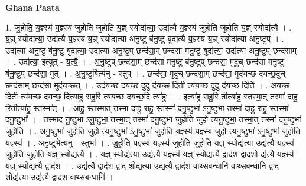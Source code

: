 \documentclass[17pt]{extarticle}
\begin{document}
\textbf{Ghana Paata } \newline

1. जु॒हो॒ति॒ य॒ज्ञ्स्य॑ य॒ज्ञ्स्य॑ जुहोति जुहोति य॒ज्ञ् स्योद्य॑त्या॒ उद्य॑त्यै य॒ज्ञ्स्य॑ जुहोति जुहोति य॒ज्ञ् स्योद्य॑त्यै । . य॒ज्ञ् स्योद्य॑त्या॒ उद्य॑त्यै य॒ज्ञ्स्य॑ य॒ज्ञ् स्योद्य॑त्या अनु॒ष्टु ब॑नु॒ष्टु बुद्य॑त्यै य॒ज्ञ्स्य॑ 
य॒ज्ञ् स्योद्य॑त्या अनु॒ष्टुप् । . उद्य॑त्या अनु॒ष्टु ब॑नु॒ष्टु बुद्य॑त्या॒ उद्य॑त्या अनु॒ष्टुप् छन्द॑सा॒म् छन्द॑सा मनु॒ष्टु बुद्य॑त्या॒ उद्य॑त्या अनु॒ष्टुप् छन्द॑साम् । . उद्य॑त्या॒ इत्युत् - य॒त्यै॒ । . अ॒नु॒ष्टुप् छन्द॑सा॒म् छन्द॑सा मनु॒ष्टु ब॑नु॒ष्टुप् छन्द॑सा॒ मुदुच् छन्द॑सा मनु॒ष्टु ब॑नु॒ष्टुप् छन्द॑सा॒ मुत् । . अ॒नु॒ष्टुबित्य॑नु - स्तुप् । . छन्द॑सा॒ मुदुच् छन्द॑सा॒म् छन्द॑सा॒ मुद॑यच्छ दयच्छ॒दुच् छन्द॑सा॒म् छन्द॑सा॒ मुद॑यच्छत् । . उद॑यच्छ दयच्छ॒ दुदु द॑यच्छ॒ दिती त्य॑यच्छ॒ दुदु द॑यच्छ॒ दिति॑ । . अ॒य॒च्छ॒ दिती त्य॑यच्छ दयच्छ॒ दित्या॑हु राहु॒रि त्य॑यच्छ दयच्छ॒दि त्या॑हुः । . इत्या॑हु राहु॒रि तीत्या॑हु॒ स्तस्मा॒त् तस्मा॑ दाहु॒ रितीत्या॑हु॒ स्तस्मा᳚त् । . आ॒हु॒ स्तस्मा॒त् तस्मा॑ दाहु राहु॒ स्तस्मा॑ दनु॒ष्टुभा॑ ऽनु॒ष्टुभा॒ तस्मा॑ दाहु राहु॒ स्तस्मा॑ दनु॒ष्टुभा᳚ । . तस्मा॑द नु॒ष्टुभा॑ ऽनु॒ष्टुभा॒ तस्मा॒त् तस्मा॑ दनु॒ष्टुभा॑ जुहोति जुहो त्यनु॒ष्टुभा॒ तस्मा॒त् तस्मा॑ दनु॒ष्टुभा॑ जुहोति । . अ॒नु॒ष्टुभा॑ जुहोति जुहो त्यनु॒ष्टुभा॑ ऽनु॒ष्टुभा॑ जुहोति य॒ज्ञ्स्य॑ य॒ज्ञ्स्य॑ जुहो त्यनु॒ष्टुभा॑ ऽनु॒ष्टुभा॑ जुहोति य॒ज्ञ्स्य॑ । . अ॒नु॒ष्टुभेत्य॑नु - स्तुभा᳚ । . जु॒हो॒ति॒ य॒ज्ञ्स्य॑ य॒ज्ञ्स्य॑ जुहोति जुहोति य॒ज्ञ् स्योद्य॑त्या॒ उद्य॑त्यै य॒ज्ञ्स्य॑ जुहोति जुहोति य॒ज्ञ् स्योद्य॑त्यै । . य॒ज्ञ् स्योद्य॑त्या॒ उद्य॑त्यै य॒ज्ञ्स्य॑ य॒ज्ञ् स्योद्य॑त्यै॒ द्वाद॑श॒ द्वाद॒शो द्य॑त्यै य॒ज्ञ्स्य॑ 
य॒ज्ञ् स्योद्य॑त्यै॒ द्वाद॑श । . उद्य॑त्यै॒ द्वाद॑श॒ द्वाद॒ शोद्य॑त्या॒ उद्य॑त्यै॒ द्वाद॑श वाथ्सब॒न्धानि॑ वाथ्सब॒न्धानि॒ द्वाद॒ शोद्य॑त्या॒ उद्य॑त्यै॒ द्वाद॑श वाथ्सब॒न्धानि॑ । \newline
\end{document}
